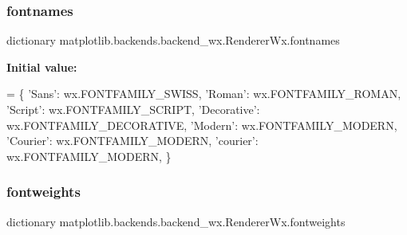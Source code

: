\subsubsection{\texorpdfstring{fontnames}{fontnames}}
{\footnotesize\ttfamily dictionary matplotlib.\+backends.\+backend\+\_\+wx.\+Renderer\+Wx.\+fontnames\hspace{0.3cm}{\ttfamily [static]}}

{\bfseries Initial value\+:}
\begin{DoxyCode}
=  \{
        \textcolor{stringliteral}{'Sans'}: wx.FONTFAMILY\_SWISS,
        \textcolor{stringliteral}{'Roman'}: wx.FONTFAMILY\_ROMAN,
        \textcolor{stringliteral}{'Script'}: wx.FONTFAMILY\_SCRIPT,
        \textcolor{stringliteral}{'Decorative'}: wx.FONTFAMILY\_DECORATIVE,
        \textcolor{stringliteral}{'Modern'}: wx.FONTFAMILY\_MODERN,
        \textcolor{stringliteral}{'Courier'}: wx.FONTFAMILY\_MODERN,
        \textcolor{stringliteral}{'courier'}: wx.FONTFAMILY\_MODERN,
    \}
\end{DoxyCode}
\mbox{\label{classmatplotlib_1_1backends_1_1backend__wx_1_1RendererWx_a54579a87317e77a89511cad65d0807df}} 
\subsubsection{\texorpdfstring{fontweights}{fontweights}}
{\footnotesize\ttfamily dictionary matplotlib.\+backends.\+backend\+\_\+wx.\+Renderer\+Wx.\+fontweights\hspace{0.3cm}{\ttfamily [static]}}

